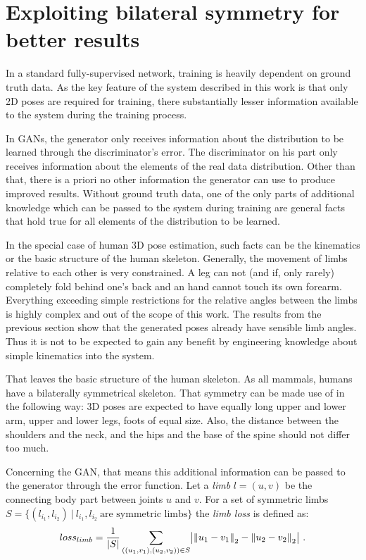 \section{Exploiting bilateral symmetry for better results}

In a standard fully-supervised network, training is heavily dependent on ground truth data.
As the key feature of the system described in this work is that only 2D poses are required for training, there substantially lesser information available to the system during the training process.

In GANs, the generator only receives information about the distribution to be learned through the discriminator's error.
The discriminator on his part only receives information about the elements of the real data distribution.
Other than that, there is a priori no other information the generator can use to produce improved results.
Without ground truth data, one of the only parts of additional knowledge which can be passed to the system during training are general facts that hold true for all elements of the distribution to be learned.

In the special case of human 3D pose estimation, such facts can be the kinematics or the basic structure of the human skeleton.
Generally, the movement of limbs relative to each other is very constrained.
A leg can not (and if, only rarely) completely fold behind one's back and an hand cannot touch its own forearm.
Everything exceeding simple restrictions for the relative angles between the limbs is highly complex and out of the scope of this work.
The results from the previous section show that the generated poses already have sensible limb angles.
Thus it is not to be expected to gain any benefit by engineering knowledge about simple kinematics into the system.

That leaves the basic structure of the human skeleton.
As all mammals, humans have a bilaterally symmetrical skeleton.
That symmetry can be made use of in the following way:
3D poses are expected to have equally long upper and lower arm, upper and lower legs, foots of equal size.
Also, the distance between the shoulders and the neck, and the hips and the base of the spine should not differ too much.

Concerning the GAN, that means this additional information can be passed to the generator through the error function.
Let a \emph{limb} $l = (u, v)$ be the connecting body part between joints $u$ and $v$.
For a set of symmetric limbs $S = \{(l_{i_1}, l_{i_2})~|~ l_{i_1}, l_{i_2}\ \text{are symmetric limbs} \}$ the \emph{limb loss} is defined as:
\begin{equation}
loss_{limb} = \frac{1}{|S|}\sum_{((u_1, v_1), (u_2, v_2)) \in S} \bigl\lvert \norm{u_1 - v_1}_2 - \norm{u_2 - v_2}_2 \bigr\rvert \ .
\end{equation}

